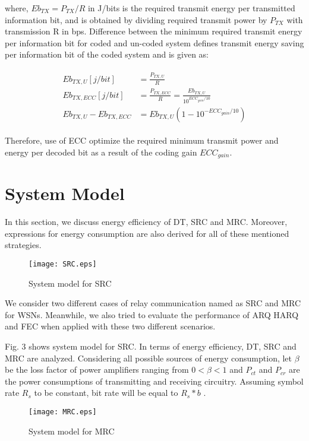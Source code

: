 \documentclass{sig-alternate}
\begin{document}
where, $Eb_{TX} = P_{TX}/R$ in J/bits is the required transmit energy per transmitted information bit, and is obtained by dividing required transmit power by $P_{TX}$ with transmission R in bps. Difference between the minimum required transmit energy per information bit for coded and un-coded system defines transmit energy saving per information bit of the coded system and is given as:

\small
 \begin{eqnarray}
 \begin{split}
Eb_{TX,U}[j/bit] &=\frac{P_{TX,U}}{R} \\
Eb_{TX,ECC}[j/bit] &=\frac{P_{TX,ECC}}{R} = \frac{Eb_{TX,U}}{10^{ECC_{gain}/10}} \\
Eb_{TX,U}-Eb_{TX,ECC} &= Eb_{TX,U}(1-10^{-ECC_{gain}/10})
\end{split}
\end{eqnarray}
\normalsize

Therefore, use of ECC optimize the required minimum transmit power and energy per decoded bit as a result of the coding gain $ECC_{gain}$.

\section{System Model}
In this section, we discuss energy efficiency of DT, SRC and MRC. Moreover, expressions for energy consumption are also derived for all of these mentioned strategies.

\begin{figure}[!ht]
\centering
{\texttt{[image: SRC.eps]}}
 \vspace{-.4cm}
\caption{System model for SRC}
\end{figure}

We consider two different cases of relay communication named as SRC and MRC for WSNs. Meanwhile, we also tried to evaluate the performance of ARQ HARQ and FEC when applied with these two different scenarios.

Fig. 3 shows system model for SRC. In terms of energy efficiency, DT, SRC and MRC are analyzed. Considering all possible sources of energy consumption, let $\beta$ be the loss factor of power amplifiers ranging from $0<\beta<1$ and $P_{ct}$ and $P_{cr}$ are the power consumptions of transmitting and receiving circuitry. Assuming symbol rate $R_s$ to be constant, bit rate will be equal to $R_{s} \ast b$ .

\begin{figure}[!ht]
\centering
{\texttt{[image: MRC.eps]}}
 \vspace{-.4cm}
\caption{System model for MRC}
\end{figure}
\end{document}
